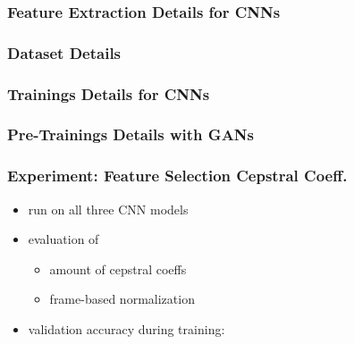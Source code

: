 \begin{frame}
  \frametitle{Feature Extraction Details for CNNs}
  \centering \vfill
  
\end{frame}

\begin{frame}
  \frametitle{Dataset Details}
  \centering \vfill
  
\end{frame}

\begin{frame}
  \frametitle{Trainings Details for CNNs}
  \centering \vfill
  
\end{frame}

\begin{frame}
  \frametitle{Pre-Trainings Details with GANs}
  \centering \vfill
  
\end{frame}

\begin{frame}
  \frametitle{Experiment: Feature Selection Cepstral Coeff.}
  \begin{itemize}
    \item run on all three CNN models
    \item evaluation of
    \begin{itemize}
     \item amount of cepstral coeffs
     \item frame-based normalization
    \end{itemize}
    \item validation accuracy during training:
  \end{itemize}
  \vspace{-0.5cm}
  \begin{figure}[!ht]
    \centering
  \end{figure}
\end{frame}

